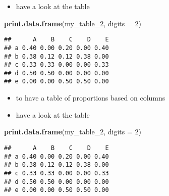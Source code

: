 \documentclass[]{article}
\newenvironment{Shaded}{\begin{snugshade}}{\end{snugshade}}
\newcommand{\DataTypeTok}[1]{\textcolor[rgb]{0.13,0.29,0.53}{#1}}
\newcommand{\DecValTok}[1]{\textcolor[rgb]{0.00,0.00,0.81}{#1}}
\newcommand{\KeywordTok}[1]{\textcolor[rgb]{0.13,0.29,0.53}{\textbf{#1}}}
\newcommand{\NormalTok}[1]{#1}
\newcommand{\OperatorTok}[1]{\textcolor[rgb]{0.81,0.36,0.00}{\textbf{#1}}}
\newcommand{\StringTok}[1]{\textcolor[rgb]{0.31,0.60,0.02}{#1}}
\providecommand{\tightlist}{%
  \setlength{\itemsep}{0pt}\setlength{\parskip}{0pt}}
\begin{document}
\begin{itemize}
\tightlist
\item
  have a look at the table
\end{itemize}

\begin{Shaded}
\begin{Highlighting}[]
\KeywordTok{print.data.frame}\NormalTok{(my_table_}\DecValTok{2}\NormalTok{, }\DataTypeTok{digits =} \DecValTok{2}\NormalTok{)}
\end{Highlighting}
\end{Shaded}

\begin{verbatim}
##      A    B    C    D    E
## a 0.40 0.00 0.20 0.00 0.40
## b 0.38 0.12 0.12 0.38 0.00
## c 0.33 0.33 0.00 0.00 0.33
## d 0.50 0.50 0.00 0.00 0.00
## e 0.00 0.00 0.50 0.50 0.00
\end{verbatim}

\begin{itemize}
\tightlist
\item
  to have a table of proportions based on columns
\end{itemize}

\begin{Shaded}
\end{Shaded}

\begin{itemize}
\tightlist
\item
  have a look at the table
\end{itemize}

\begin{Shaded}
\begin{Highlighting}[]
\KeywordTok{print.data.frame}\NormalTok{(my_table_}\DecValTok{2}\NormalTok{, }\DataTypeTok{digits =} \DecValTok{2}\NormalTok{)}
\end{Highlighting}
\end{Shaded}

\begin{verbatim}
##      A    B    C    D    E
## a 0.40 0.00 0.20 0.00 0.40
## b 0.38 0.12 0.12 0.38 0.00
## c 0.33 0.33 0.00 0.00 0.33
## d 0.50 0.50 0.00 0.00 0.00
## e 0.00 0.00 0.50 0.50 0.00
\end{verbatim}
\end{document}
